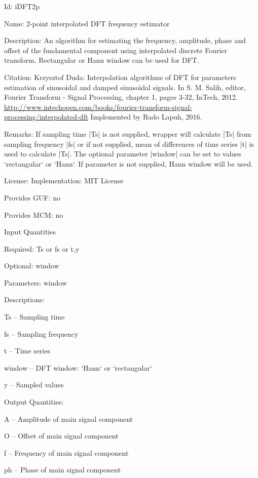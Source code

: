 \begin{tightdesc}
\item [Id:] iDFT2p
\item [Name:] 2-point interpolated DFT frequency estimator
\item [Description:] An algorithm for estimating the frequency, amplitude, phase and offset of the fundamental component using interpolated discrete Fourier transform. Rectangular or Hann window can be used for DFT.
\item [Citation:] Krzysztof Duda: Interpolation algorithms of DFT for parameters estimation of sinusoidal and damped sinusoidal signals. In S. M. Salih, editor, Fourier Transform - Signal Processing, chapter 1, pages 3-32, InTech, 2012. \url{http://www.intechopen.com/books/fourier-transform-signal-processing/interpolated-dft} Implemented by Rado Lapuh, 2016.
\item [Remarks:] If sampling time |Ts| is not supplied, wrapper will calculate |Ts| from sampling frequency |fs| or if not supplied, mean of differences of time series |t| is used to calculate |Ts|. The optional parameter |window| can be set to values `rectangular` or `Hann`. If parameter is not supplied, Hann window will be used.
\item [License:] Implementation: MIT License
\item [Provides GUF:] no
\item [Provides MCM:] no
\item [Input Quantities] \rule{0em}{0em}
    \begin{tightdesc}
    \item [Required:] 
        \textsf{Ts} or \textsf{fs} or \textsf{t},\enspace \textsf{y}
    \item [Optional:] 
        \textsf{window}
    \item [Parameters:] 
        \textsf{window}
    \item [Descriptions:] \rule{0em}{0em}
        \begin{tightdesc}
            \item[\textsf{Ts}] -- Sampling time
            \item[\textsf{fs}] -- Sampling frequency
            \item[\textsf{t}] -- Time series
            \item[\textsf{window}] -- DFT window: `Hann` or `rectangular`
            \item[\textsf{y}] -- Sampled values
        \end{tightdesc}
    \end{tightdesc}
\item [Output Quantities:] \rule{0em}{0em}
    \begin{tightdesc}
        \item[\textsf{A}] -- Amplitude of main signal component
        \item[\textsf{O}] -- Offset of main signal component
        \item[\textsf{f}] -- Frequency of main signal component
        \item[\textsf{ph}] -- Phase of main signal component
    \end{tightdesc}
\end{tightdesc}
